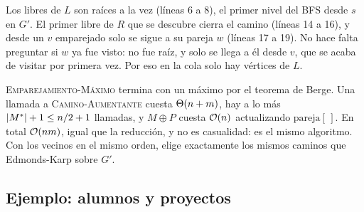 \documentclass[11pt,letterpaper]{article}
\begin{document}
Los libres de $L$ son raíces a la vez (líneas 6 a 8), el primer nivel
del BFS desde $s$ en $G'$. El primer libre de $R$ que se descubre
cierra el camino (líneas 14 a 16), y desde un $v$ emparejado solo se
sigue a su pareja $w$ (líneas 17 a 19). No hace falta preguntar si $w$
ya fue visto: no fue raíz, y solo se llega a él desde $v$, que se
acaba de visitar por primera vez. Por eso en la cola solo hay
vértices de $L$.

\textsc{Emparejamiento-Máximo} termina con un máximo por el teorema
de Berge. Una llamada a \textsc{Camino-Aumentante} cuesta
$\Theta\!\left(n + m\right)$, hay a lo más $\left\lvert M^* \right\rvert + 1 \le n/2 + 1$ llamadas, y
$M \oplus P$ cuesta $\mathcal{O}\!\left(n\right)$ actualizando $\text{pareja}[\,]$. En
total $\mathcal{O}\!\left(nm\right)$, igual que la reducción, y no es casualidad: es el
mismo algoritmo. Con los vecinos en el mismo orden, elige exactamente
los mismos caminos que Edmonds-Karp sobre $G'$.


\subsection*{Ejemplo: alumnos y proyectos}
\end{document}
